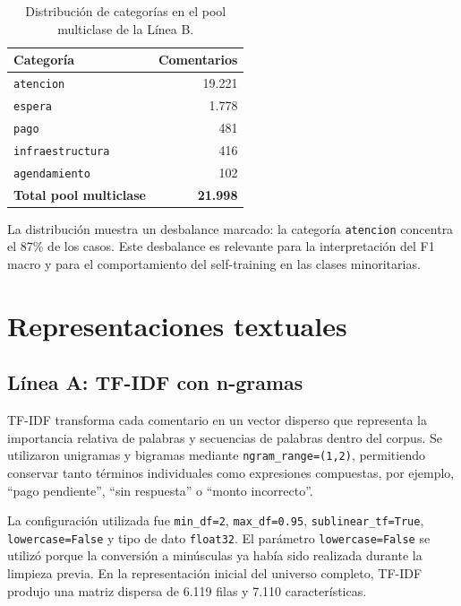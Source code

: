 \documentclass[12pt,a4paper]{article}
\newcommand{\code}[1]{\nolinkurl{#1}}
\begin{document}
\begin{table}[htbp]
\centering
\caption{Distribución de categorías en el pool multiclase de la Línea B.}
\label{tab:categorias_b}
\small
\begin{tabularx}{\textwidth}{@{}Y r@{}}
\toprule
\textbf{Categoría} & \textbf{Comentarios} \\
\midrule
\code{atencion}         & 19.221 \\
\code{espera}           & 1.778 \\
\code{pago}             & 481 \\
\code{infraestructura}  & 416 \\
\code{agendamiento}     & 102 \\
\midrule
\textbf{Total pool multiclase} & \textbf{21.998} \\
\bottomrule
\end{tabularx}
\end{table}
\FloatBarrier

La distribución muestra un desbalance marcado: la categoría \code{atencion} concentra el 87\% de los casos. Este desbalance es relevante para la interpretación del F1 macro y para el comportamiento del self-training en las clases minoritarias.

\section{Representaciones textuales}

\subsection{Línea A: TF-IDF con n-gramas}

TF-IDF transforma cada comentario en un vector disperso que representa la importancia relativa de palabras y secuencias de palabras dentro del corpus. Se utilizaron unigramas y bigramas mediante \code{ngram\_range=(1,2)}, permitiendo conservar tanto términos individuales como expresiones compuestas, por ejemplo, ``pago pendiente'', ``sin respuesta'' o ``monto incorrecto''.

La configuración utilizada fue \code{min\_df=2}, \code{max\_df=0.95}, \code{sublinear\_tf=True}, \code{lowercase=False} y tipo de dato \code{float32}. El parámetro \code{lowercase=False} se utilizó porque la conversión a minúsculas ya había sido realizada durante la limpieza previa. En la representación inicial del universo completo, TF-IDF produjo una matriz dispersa de 6.119 filas y 7.110 características.
\end{document}
